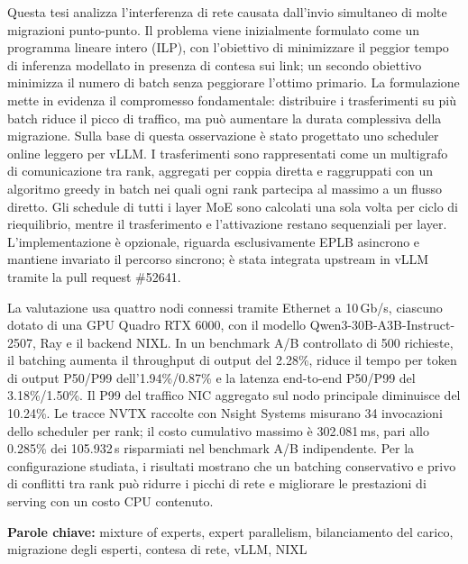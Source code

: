 \documentclass{Configuration_Files/PoliMi3i_thesis}
\newcommand{\SI}[2]{#1\,#2}
\newcommand{\prnumber}{\#52641}
\begin{document}
Questa tesi analizza l'interferenza di rete causata dall'invio simultaneo di
molte migrazioni punto-punto. Il problema viene inizialmente formulato come un
programma lineare intero (ILP), con l'obiettivo di minimizzare il peggior tempo
di inferenza modellato in presenza di contesa sui link; un secondo obiettivo
minimizza il numero di batch senza peggiorare l'ottimo primario. La formulazione
mette in evidenza il compromesso fondamentale: distribuire i trasferimenti su
più batch riduce il picco di traffico, ma può aumentare la durata complessiva
della migrazione. Sulla base di questa osservazione è stato progettato uno scheduler
online leggero per vLLM. I trasferimenti sono rappresentati come un multigrafo
di comunicazione tra rank, aggregati per coppia diretta e raggruppati con un
algoritmo greedy in batch nei quali ogni rank partecipa al massimo a un flusso
diretto.
Gli schedule di tutti i layer MoE sono calcolati una sola volta per ciclo di
riequilibrio, mentre il trasferimento e l'attivazione restano sequenziali per
layer. L'implementazione è opzionale, riguarda esclusivamente EPLB asincrono e
mantiene invariato il percorso sincrono; è stata integrata upstream in vLLM
tramite la pull request \prnumber.

La valutazione usa quattro nodi connessi tramite Ethernet a \SI{10}{Gb/s},
ciascuno dotato di una GPU Quadro RTX 6000, con il modello
Qwen3-30B-A3B-Instruct-2507, Ray e il backend NIXL. In un benchmark A/B
controllato di 500 richieste, il batching aumenta il throughput di output del
2.28\%, riduce il tempo per token di output P50/P99 dell'1.94\%/0.87\% e la
latenza end-to-end P50/P99 del 3.18\%/1.50\%. Il P99 del traffico NIC aggregato
sul nodo principale diminuisce del 10.24\%. Le tracce NVTX raccolte con Nsight
Systems misurano 34 invocazioni dello scheduler per rank; il costo cumulativo
massimo è \SI{302.081}{ms}, pari allo 0.285\% dei \SI{105.932}{s} risparmiati
nel benchmark A/B indipendente. Per la configurazione studiata, i risultati
mostrano che un batching conservativo e privo di conflitti tra rank può ridurre
i picchi di rete e migliorare le prestazioni di serving con un costo CPU
contenuto.

\textbf{Parole chiave:} mixture of experts, expert parallelism, bilanciamento
del carico, migrazione degli esperti, contesa di rete, vLLM, NIXL

\thispagestyle{empty}
\tableofcontents
\thispagestyle{empty}
\listoffigures
\listoftables
\printglossary[type=\acronymtype]
\cleardoublepage

\mainmatter
\end{document}
